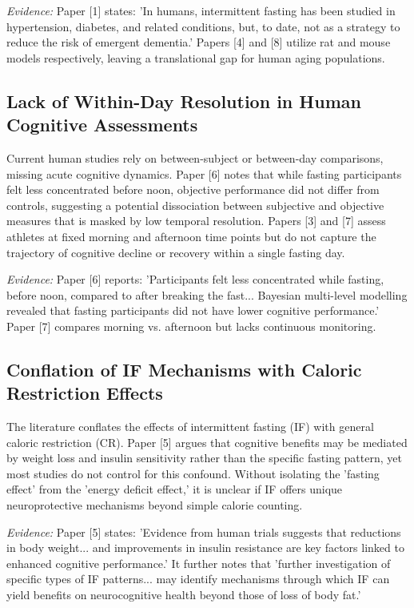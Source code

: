 \documentclass[conference]{IEEEtran}
\begin{document}
\textit{Evidence:} Paper [1] states: 'In humans, intermittent fasting has been studied in hypertension, diabetes, and related conditions, but, to date, not as a strategy to reduce the risk of emergent dementia.' Papers [4] and [8] utilize rat and mouse models respectively, leaving a translational gap for human aging populations.

\subsection{Lack of Within-Day Resolution in Human Cognitive Assessments}
Current human studies rely on between-subject or between-day comparisons, missing acute cognitive dynamics. Paper [6] notes that while fasting participants felt less concentrated before noon, objective performance did not differ from controls, suggesting a potential dissociation between subjective and objective measures that is masked by low temporal resolution. Papers [3] and [7] assess athletes at fixed morning and afternoon time points but do not capture the trajectory of cognitive decline or recovery within a single fasting day.

\textit{Evidence:} Paper [6] reports: 'Participants felt less concentrated while fasting, before noon, compared to after breaking the fast... Bayesian multi-level modelling revealed that fasting participants did not have lower cognitive performance.' Paper [7] compares morning vs. afternoon but lacks continuous monitoring.

\subsection{Conflation of IF Mechanisms with Caloric Restriction Effects}
The literature conflates the effects of intermittent fasting (IF) with general caloric restriction (CR). Paper [5] argues that cognitive benefits may be mediated by weight loss and insulin sensitivity rather than the specific fasting pattern, yet most studies do not control for this confound. Without isolating the 'fasting effect' from the 'energy deficit effect,' it is unclear if IF offers unique neuroprotective mechanisms beyond simple calorie counting.

\textit{Evidence:} Paper [5] states: 'Evidence from human trials suggests that reductions in body weight... and improvements in insulin resistance are key factors linked to enhanced cognitive performance.' It further notes that 'further investigation of specific types of IF patterns... may identify mechanisms through which IF can yield benefits on neurocognitive health beyond those of loss of body fat.'
\end{document}
